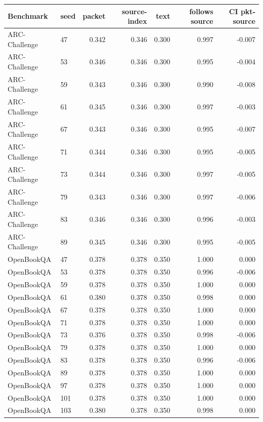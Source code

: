 \documentclass{article}
\newcommand{\arc}{ARC-Challenge}
\newcommand{\obqa}{OpenBookQA}
\begin{document}
\begin{table}[h]
  \centering
  \scriptsize
  \setlength{\tabcolsep}{3pt}
  \begin{tabular}{llrrrrr}
    \toprule
    Benchmark & seed & packet & source-index & text & follows source & CI pkt-source \\
    \midrule
    \arc{} & 47 & 0.342 & 0.346 & 0.300 & 0.997 & -0.007 \\
    \arc{} & 53 & 0.346 & 0.346 & 0.300 & 0.995 & -0.004 \\
    \arc{} & 59 & 0.343 & 0.346 & 0.300 & 0.990 & -0.008 \\
    \arc{} & 61 & 0.345 & 0.346 & 0.300 & 0.997 & -0.003 \\
    \arc{} & 67 & 0.343 & 0.346 & 0.300 & 0.995 & -0.007 \\
    \arc{} & 71 & 0.344 & 0.346 & 0.300 & 0.995 & -0.005 \\
    \arc{} & 73 & 0.344 & 0.346 & 0.300 & 0.997 & -0.005 \\
    \arc{} & 79 & 0.343 & 0.346 & 0.300 & 0.997 & -0.006 \\
    \arc{} & 83 & 0.346 & 0.346 & 0.300 & 0.996 & -0.003 \\
    \arc{} & 89 & 0.345 & 0.346 & 0.300 & 0.995 & -0.005 \\
    \obqa{} & 47 & 0.378 & 0.378 & 0.350 & 1.000 & 0.000 \\
    \obqa{} & 53 & 0.378 & 0.378 & 0.350 & 0.996 & -0.006 \\
    \obqa{} & 59 & 0.378 & 0.378 & 0.350 & 1.000 & 0.000 \\
    \obqa{} & 61 & 0.380 & 0.378 & 0.350 & 0.998 & 0.000 \\
    \obqa{} & 67 & 0.378 & 0.378 & 0.350 & 1.000 & 0.000 \\
    \obqa{} & 71 & 0.378 & 0.378 & 0.350 & 1.000 & 0.000 \\
    \obqa{} & 73 & 0.376 & 0.378 & 0.350 & 0.998 & -0.006 \\
    \obqa{} & 79 & 0.378 & 0.378 & 0.350 & 1.000 & 0.000 \\
    \obqa{} & 83 & 0.378 & 0.378 & 0.350 & 0.996 & -0.006 \\
    \obqa{} & 89 & 0.378 & 0.378 & 0.350 & 1.000 & 0.000 \\
    \obqa{} & 97 & 0.378 & 0.378 & 0.350 & 1.000 & 0.000 \\
    \obqa{} & 101 & 0.378 & 0.378 & 0.350 & 1.000 & 0.000 \\
    \obqa{} & 103 & 0.380 & 0.378 & 0.350 & 0.998 & 0.000 \\

\end{tabular}
\end{table}
\end{document}

